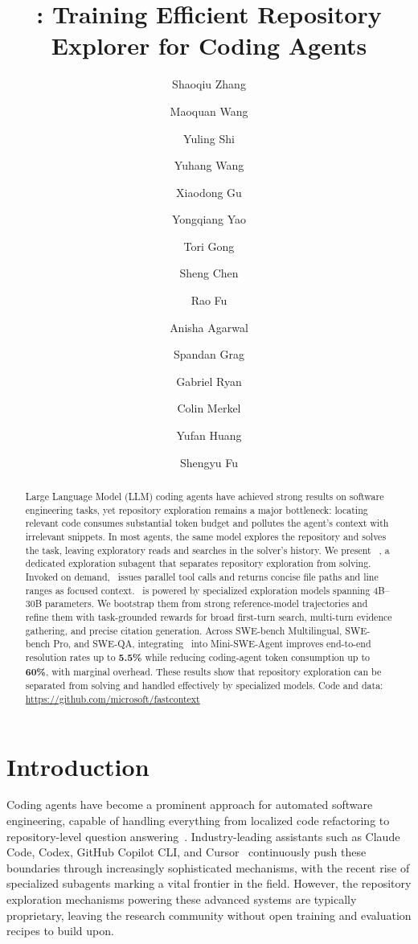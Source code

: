 \documentclass{llmxive}
\title{\approach: Training Efficient Repository Explorer for Coding Agents}
\author{Shaoqiu Zhang \and Maoquan Wang \and Yuling Shi \and Yuhang Wang \and Xiaodong Gu \and Yongqiang Yao \and Tori Gong \and Sheng Chen \and Rao Fu \and Anisha Agarwal \and Spandan Grag \and Gabriel Ryan \and Colin Merkel \and Yufan Huang \and Shengyu Fu}
\providecommand{\thefootnote}{\fnsymbol{footnote}}
\providecommand{\maketitle}{}
\providecommand{\approach}{~}
\begin{document}
\maketitle
\begin{abstract}
Large Language Model (LLM) coding agents have achieved strong results on software engineering tasks, yet repository exploration remains a major bottleneck: locating relevant code consumes substantial token budget and pollutes the agent's context with irrelevant snippets.
%
In most agents, the same model explores the repository and solves the task, leaving exploratory reads and searches in the solver's history.
We present \approach, a dedicated exploration subagent that separates repository exploration from solving.
Invoked on demand, \approach issues parallel tool calls and returns concise file paths and line ranges as focused context.
%
\approach is powered by specialized exploration models spanning 4B--30B parameters.
We bootstrap them from strong reference-model trajectories and refine them with task-grounded rewards for broad first-turn search, multi-turn evidence gathering, and precise citation generation.
%
Across SWE-bench Multilingual, SWE-bench Pro, and SWE-QA, integrating \approach into Mini-SWE-Agent improves end-to-end resolution rates up to \textbf{5.5\%} while reducing coding-agent token consumption up to \textbf{60\%}, with marginal overhead.
These results show that repository exploration can be separated from solving and handled effectively by specialized models. Code and data: \url{https://github.com/microsoft/fastcontext}

\begingroup
\renewcommand{\thefootnote}{\fnsymbol{footnote}}
\setcounter{footnote}{0}
\endgroup
\end{abstract}
\section{Introduction}
\label{sec:intro}

Coding agents have become a prominent approach for automated software engineering, capable of handling everything from localized code refactoring to repository-level question answering~\cite{sweagent, autocoderover, agentless, openhands}. Industry-leading assistants such as Claude Code, Codex, GitHub Copilot CLI, and Cursor~\cite{claudecode, openaicodex, githubcopilotcli, cursor} continuously push these boundaries through increasingly sophisticated mechanisms, with the recent rise of specialized subagents marking a vital frontier in the field. However, the repository exploration mechanisms powering these advanced systems are typically proprietary, leaving the research community without open training and evaluation recipes to build upon.
\end{document}
